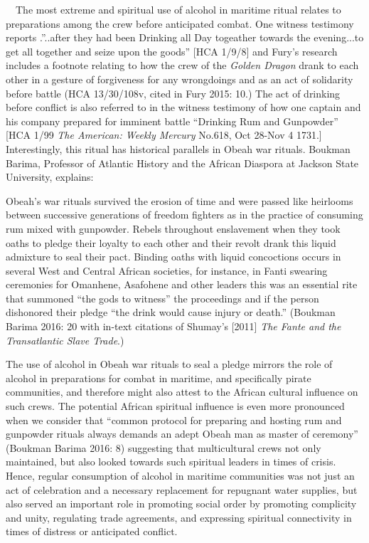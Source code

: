 \begin{styleStandard}
\ \ The most extreme and spiritual use of alcohol in maritime ritual relates to preparations among the crew before anticipated combat. One witness testimony reports .”..after they had been Drinking all Day togeather towards the evening...to get all together and seize upon the goods” [HCA 1/9/8] and Fury’s research includes a footnote relating to how the crew of the \textit{Golden Dragon} drank to each other in a gesture of forgiveness for any wrongdoings and as an act of solidarity before battle (HCA 13/30/108v, cited in Fury 2015: 10.) The act of drinking before conflict is also referred to in the witness testimony of how one captain and his company prepared for imminent battle “Drinking Rum and Gunpowder” [HCA 1/99 \textit{The American: Weekly Mercury} No.618, Oct 28-Nov 4 1731.] Interestingly, this ritual has historical parallels in Obeah war rituals. Boukman Barima, Professor of Atlantic History and the African Diaspora at Jackson State University, explains:
\end{styleStandard}

\begin{styleStandard}
Obeah’s war rituals survived the erosion of time and were passed like heirlooms between successive generations of freedom fighters as in the practice of consuming rum mixed with gunpowder. Rebels throughout enslavement when they took oaths to pledge their loyalty to each other and their revolt drank this liquid admixture to seal their pact. Binding oaths with liquid concoctions occurs in several West and Central African societies, for instance, in Fanti swearing ceremonies for Omanhene, Asafohene and other leaders this was an essential rite that summoned “the gods to witness” the proceedings and if the person dishonored their pledge “the drink would cause injury or death.” (Boukman Barima 2016: 20 with in-text citations of Shumay’s [2011] \textit{The Fante and the Transatlantic Slave Trade}.)
\end{styleStandard}

\begin{styleStandard}
The use of alcohol in Obeah war rituals to seal a pledge mirrors the role of alcohol in preparations for combat in maritime, and specifically pirate communities, and therefore might also attest to the African cultural influence on such crews. The potential African spiritual influence is even more pronounced when we consider that “common protocol for preparing and hosting rum and gunpowder rituals always demands an adept Obeah man as master of ceremony” (Boukman Barima 2016: 8) suggesting that multicultural crews not only maintained, but also looked towards such spiritual leaders in times of crisis. Hence, regular consumption of alcohol in maritime communities was not just an act of celebration and a necessary replacement for repugnant water supplies, but also served an important role in promoting social order by promoting complicity and unity, regulating trade agreements, and expressing spiritual connectivity in times of distress or anticipated conflict. 
\end{styleStandard}


